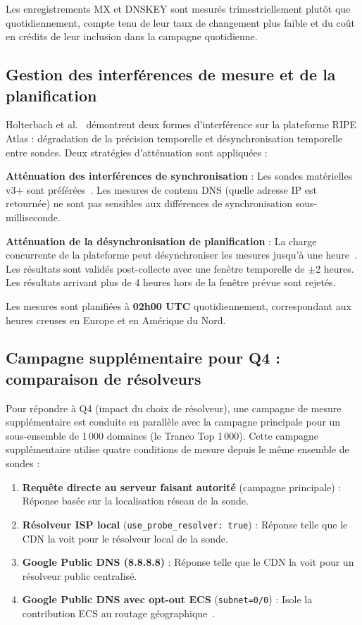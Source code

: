 Les enregistrements MX et DNSKEY sont mesurés trimestriellement plutôt que quotidiennement, compte tenu de leur taux de changement plus faible et du coût en crédits de leur inclusion dans la campagne quotidienne.

\subsection{Gestion des interférences de mesure et de la planification}
\label{subsec:3.3.4}

Holterbach et al.~\cite{Holterbach2015} démontrent deux formes d'interférence sur la plateforme RIPE Atlas : dégradation de la précision temporelle et désynchronisation temporelle entre sondes. Deux stratégies d'atténuation sont appliquées :

\textbf{Atténuation des interférences de synchronisation} : Les sondes matérielles v3+ sont préférées~\cite{Holterbach2015}. Les mesures de contenu DNS (quelle adresse IP est retournée) ne sont pas sensibles aux différences de synchronisation sous-milliseconde.

\textbf{Atténuation de la désynchronisation de planification} : La charge concurrente de la plateforme peut désynchroniser les mesures jusqu'à une heure~\cite{Holterbach2015}. Les résultats sont validés post-collecte avec une fenêtre temporelle de $\pm$2 heures. Les résultats arrivant plus de 4 heures hors de la fenêtre prévue sont rejetés.

Les mesures sont planifiées à \textbf{02h00 UTC} quotidiennement, correspondant aux heures creuses en Europe et en Amérique du Nord.

\subsection{Campagne supplémentaire pour Q4 : comparaison de résolveurs}
\label{subsec:3.3.5}

Pour répondre à Q4 (impact du choix de résolveur), une campagne de mesure supplémentaire est conduite en parallèle avec la campagne principale pour un sous-ensemble de 1\,000 domaines (le Tranco Top 1\,000). Cette campagne supplémentaire utilise quatre conditions de mesure depuis le même ensemble de sondes :

\begin{enumerate}
  \item \textbf{Requête directe au serveur faisant autorité} (campagne principale) : Réponse basée sur la localisation réseau de la sonde.
  \item \textbf{Résolveur ISP local} (\texttt{use\_probe\_resolver: true}) : Réponse telle que le CDN la voit pour le résolveur local de la sonde.
  \item \textbf{Google Public DNS (8.8.8.8)} : Réponse telle que le CDN la voit pour un résolveur public centralisé.
  \item \textbf{Google Public DNS avec opt-out ECS} (\texttt{subnet=0/0}) : Isole la contribution ECS au routage géographique~\cite{RFC7871}.
\end{enumerate}

